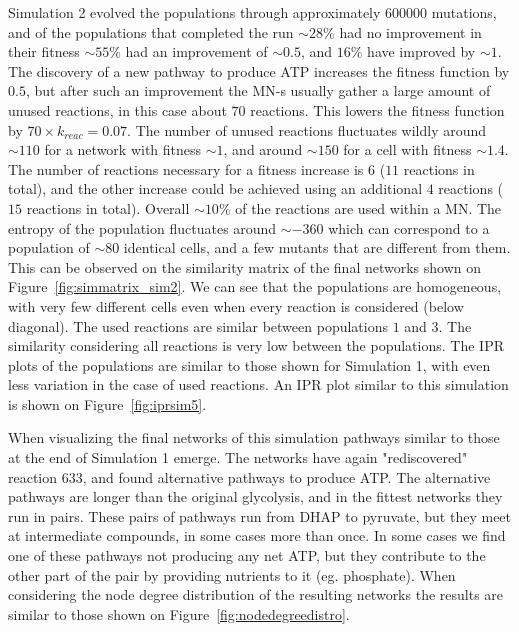 \documentclass[a4paper,12pt]{article}
\begin{document}
Simulation 2 evolved the populations through approximately $600 000$ mutations, and of the populations that completed the run $\sim 28 \%$ had no improvement in their fitness $\sim 55 \%$ had an improvement of $\sim 0.5$, and $16 \%$ have improved by $\sim 1$. The discovery of a new pathway to produce ATP increases the fitness function by $0.5$, but after such an improvement the MN-s usually gather a large amount of unused reactions, in this case about $70$ reactions. This lowers the fitness function by $70\times k_{reac}=0.07$. The number of unused reactions fluctuates wildly around $\sim 110$ for a network with fitness $\sim 1$, and around $\sim 150$ for a cell with fitness $\sim 1.4$. The number of reactions necessary for a fitness increase is $6$ ($11$ reactions in total), and the other increase could be achieved using an additional $4$ reactions ($15$ reactions in total). Overall $\sim 10\%$ of the reactions are used within a MN. The entropy of the population fluctuates around $\sim -360$ which can correspond to a population of $\sim 80$ identical cells, and a few mutants that are different from them. This can be observed on the similarity matrix of the final networks shown on Figure~\ref{fig:simmatrix_sim2}. We can see that the populations are homogeneous, with very few different cells even when every reaction is considered (below diagonal). The used reactions are similar between populations $1$ and $3$. The similarity considering all reactions is very low between the populations. 
The IPR plots of the populations are similar to those shown for Simulation 1, with even less variation in the case of used reactions. An IPR plot similar to this simulation is shown on Figure~\ref{fig:iprsim5}. 

When visualizing the final networks of this simulation pathways similar to those at the end of Simulation 1 emerge. The networks have again "rediscovered" reaction $633$, and found alternative pathways to produce ATP. The alternative pathways are longer than the original glycolysis, and in the fittest networks they run in pairs. These pairs of pathways run from DHAP to pyruvate, but they meet at intermediate compounds, in some cases more than once. In some cases we find one of these pathways not producing any net ATP, but they contribute to the other part of the pair by providing nutrients to it (eg. phosphate). When considering the node degree distribution of the resulting networks the results are similar to those shown on Figure~\ref{fig:nodedegreedistro}. 
\end{document}
